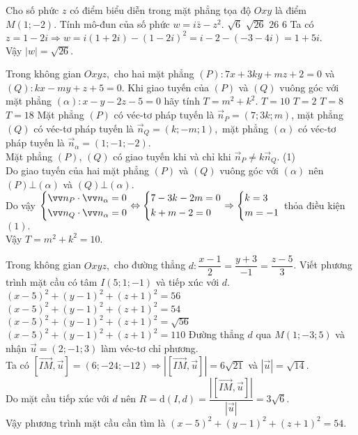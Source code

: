 \begin{ex}%
Cho số phức $ z $	có điểm biểu diễn trong mặt phẳng tọa độ $ Oxy $ là điểm $ M(1;-2) $. Tính mô-đun của số phức $ w=i \bar{z}-z^2. $
	\choice
	{$ \sqrt{6} $}
	{\True $ \sqrt{26} $}
	{$ 26 $}
	{$ 6 $}
	\loigiai
	{Ta có $ z=1-2i \Rightarrow w=i(1+2i)-(1-2i)^2=i-2-(-3-4i)=1+5i. $\\
		Vậy $ \left|w\right|=\sqrt{26}. $
	}
\end{ex}
\begin{ex}%
Trong không gian $ Oxyz, $	cho hai mặt phẳng $ (P)\colon 7x+3ky+mz+2=0 $ và $ (Q) \colon kx-my+z+5=0 $. Khi giao tuyến của $ (P) $ và $ (Q) $ vuông góc với mặt phẳng $ \left(\alpha\right) \colon x-y-2z-5=0$ hãy tính $ T=m^2+k^2. $
	\choice
	{\True $ T=10 $}
	{$ T=2 $}
	{$ T=8 $}
	{$ T=18 $}
	\loigiai
{Mặt phẳng $ (P) $ có véc-tơ pháp tuyến là $ \vec{n}_P=(7;3k;m) $, mặt phẳng $ (Q) $ có véc-tơ pháp tuyến là $ \vec{n}_Q=(k;-m;1) $,\, mặt phẳng $ (\alpha) $ có véc-tơ pháp tuyến là $ \vec{n}_\alpha=(1;-1;-2) $.\\ Mặt phẳng $ (P) $, $ (Q) $ có giao tuyến khi và chỉ khi $ \vec{n}_P \ne k \vec{n}_Q $. \quad (1)\\
		Do giao tuyến của hai mặt phẳng $ (P) $ và $ (Q) $ vuông góc với $ (\alpha) $ nên $ (P) \bot (\alpha) $ và $ (Q) \bot (\alpha)$.\\
	Do vậy 
	$ \heva{&\vec{n}_P \cdot \vec{n}_\alpha=0\\&\vec{n}_Q \cdot \vec{n}_\alpha=0} \Leftrightarrow \heva{&7-3k-2m=0\\&k+m-2=0} \Rightarrow \heva{&k=3\\&m=-1} $ thỏa điều kiện $ (1). $\\ Vậy $ T = m^2 + k^2 = 10. $
	}
\end{ex}
\begin{ex}%
Trong không gian $ Oxyz, $	cho đường thẳng $ d\colon \dfrac{x-1}{2}=\dfrac{y+3}{-1}=\dfrac{z-5}{3} $. Viết phương trình mặt cầu có tâm $ I(5;1;-1) $ và tiếp xúc với $ d. $
	\choice
	{$ \left(x-5\right)^2+(y-1)^2+(z+1)^2=56 $}
	{\True $ \left(x-5\right)^2+(y-1)^2+(z+1)^2=54 $}
	{$ \left(x-5\right)^2+(y-1)^2+(z+1)^2=\sqrt{56} $}
	{$ \left(x-5\right)^2+(y-1)^2+(z+1)^2=110 $}
	\loigiai
	{Đường thẳng $ d $ qua $ M(1;-3;5) $ và nhận $ \vec{u}=(2;-1;3) $ làm véc-tơ chỉ phương.\\
		Ta có $\left[\vec{IM},\vec{u}\right]=\left(6;-24;-12\right)  \Rightarrow \left|\left[\vec{IM},\vec{u}\right]\right| = 6\sqrt{21}$ và $ \left|\vec{u}\right|=\sqrt{14} $.\\
	Do mặt cầu tiếp xúc với $ d $	 nên $ R=\mathrm{d}\left(I,d\right)=\dfrac{\left|\left[\vec{IM},\vec{u}\right]\right|}{\left|\vec{u}\right|}=3\sqrt{6}. $\\
	Vậy phương trình mặt cầu cần tìm là $ (x-5)^2+(y-1)^2+(z+1)^2=54. $}
\end{ex}
